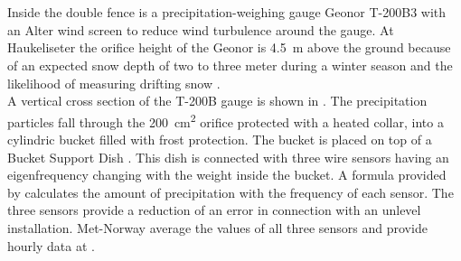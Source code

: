 \\ \\
Inside the double fence is a precipitation-weighing gauge Geonor T-200B3 \citep[3-wire transducers, \SI{1000}{\mm},][]{geonor_inc._t-200b_2015} with an Alter wind screen to reduce wind turbulence around the gauge. At Haukeliseter the orifice height of the Geonor is \SI{4.5}{\metre} above the ground because of an expected snow depth of two to three meter during a winter season and the likelihood of measuring drifting snow \citep{wolff_measurements_2013,wolff_derivation_2015}. \\
A vertical cross section of the T-200B gauge is shown in . The precipitation particles fall through the \SI{200}{\square\cm} orifice protected with a heated collar, into a cylindric bucket filled with frost protection. The bucket is placed on top of a Bucket Support Dish \citep[,][]{geonor_inc._t-200b_2015}. This dish is connected with three wire sensors having an eigenfrequency changing with the weight inside the bucket. A formula provided by \citet{geonor_inc._t-200b_2015} calculates the amount of precipitation with the frequency of each sensor. The three sensors provide a reduction of an error in connection with an unlevel installation. Met-Norway average the values of all three sensors and provide hourly data at \citeauthor{eklima_norwegian_2016}.
